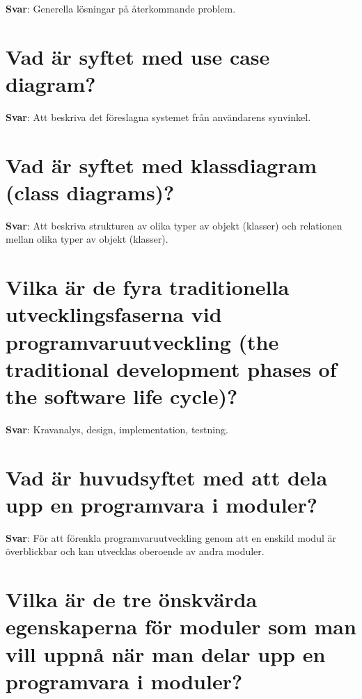 \documentclass[a4paper,11pt,oneside]{book}
\begin{document}
\begin{sloppypar}
\label{q:223:sa:sv:True}

\textbf{Svar}: Generella l\"osningar p\r{a} \r{a}terkommande problem.



\section{Vad \"ar syftet med use case diagram?}

\label{q:224:sa:sv:True}

\textbf{Svar}: Att beskriva det f\"oreslagna systemet fr\r{a}n anv\"andarens synvinkel.



\section{Vad \"ar syftet med klassdiagram (class diagrams)?}

\label{q:225:sa:sv:True}

\textbf{Svar}: Att beskriva strukturen av olika typer av objekt (klasser) och relationen mellan olika typer av objekt (klasser).



\section{Vilka \"ar de fyra traditionella utvecklingsfaserna vid programvaruutveckling (the traditional development phases of the software life cycle)?}

\label{q:226:sa:sv:True}

\textbf{Svar}: Kravanalys, design, implementation, testning.



\section{Vad \"ar huvudsyftet med att dela upp en programvara i moduler?}

\label{q:227:sa:sv:True}

\textbf{Svar}: F\"or att f\"orenkla programvaruutveckling genom att en enskild modul \"ar \"overblickbar och kan utvecklas oberoende av andra moduler.



\section{Vilka \"ar de tre \"onskv\"arda egenskaperna f\"or moduler som man vill uppn\r{a} n\"ar man delar upp en programvara i moduler?}


\end{sloppypar}
\end{document}
